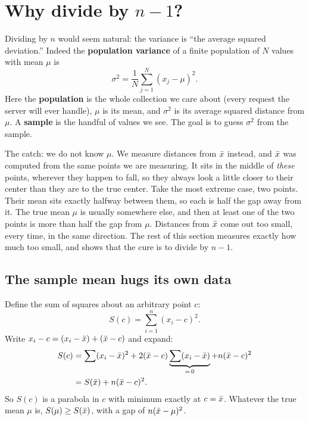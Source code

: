 \section{Why divide by $n-1$?}
\label{sec:center-spread-bessel}

Dividing by $n$ would seem natural: the variance is ``the average squared
deviation.'' Indeed the \textbf{population variance} of a finite population of $N$
values with mean $\mu$ is
\[
  \sigma^2 = \frac{1}{N}\sum_{j=1}^N (x_j - \mu)^2 .
\]
Here the \textbf{population} is the whole collection we care about (every request
the server will ever handle), $\mu$ is its mean, and $\sigma^2$ is its average
squared distance from $\mu$. A \textbf{sample} is the handful of values we see. The goal is to guess $\sigma^2$ from the sample.

The catch: we do not know $\mu$. We measure distances from $\bar{x}$ instead, and
$\bar{x}$ was computed from the same points we are measuring. It sits in the middle of
\emph{these} points, wherever they happen to fall, so they always look a little
closer to their center than they are to the true center. Take the most
extreme case, two points. Their mean sits exactly halfway between them, so each is
half the gap away from it. The true mean $\mu$ is usually somewhere else, and then at
least one of the two points is more than half the gap from $\mu$. Distances from
$\bar{x}$ come out too small, every time, in the same direction. The rest of this
section measures exactly how much too small, and shows that the cure is to divide
by $n-1$.

\subsection{The sample mean hugs its own data}

Define the sum of squares about an arbitrary point $c$:
\[
  S(c) = \sum_{i=1}^n (x_i - c)^2 .
\]
Write $x_i - c = (x_i - \bar{x}) + (\bar{x} - c)$ and expand:
\begin{align*}
  S(c) &= \sum (x_i-\bar{x})^2 + 2(\bar{x} - c)\underbrace{\sum (x_i - \bar{x})}_{=\,0}
         + n(\bar{x} - c)^2 \\
       &= S(\bar{x}) + n(\bar{x} - c)^2 .
\end{align*}
So $S(c)$ is a parabola in $c$ with minimum exactly at $c = \bar{x}$. Whatever the true
mean $\mu$ is, $S(\mu) \ge S(\bar{x})$, with a gap of $n(\bar{x}-\mu)^2$.

